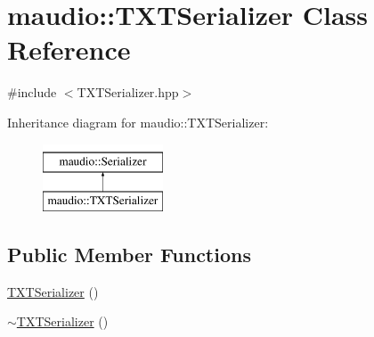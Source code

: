 \hypertarget{classmaudio_1_1TXTSerializer}{\section{maudio\-:\-:T\-X\-T\-Serializer Class Reference}
\label{classmaudio_1_1TXTSerializer}
}


{\ttfamily \#include $<$T\-X\-T\-Serializer.\-hpp$>$}

Inheritance diagram for maudio\-:\-:T\-X\-T\-Serializer\-:\begin{figure}[H]
\begin{center}
\leavevmode
\includegraphics[height=2.000000cm]{classmaudio_1_1TXTSerializer}
\end{center}
\end{figure}
\subsection*{Public Member Functions}
\begin{DoxyCompactItemize}
\item 
\hyperlink{classmaudio_1_1TXTSerializer_a346bdb95f48c621f777c72ff1dbc7763}{T\-X\-T\-Serializer} ()
\item 
\hyperlink{classmaudio_1_1TXTSerializer_a595cb1f5f07fa66b3b678694e0d61c11}{$\sim$\-T\-X\-T\-Serializer} ()
\end{DoxyCompactItemize}


